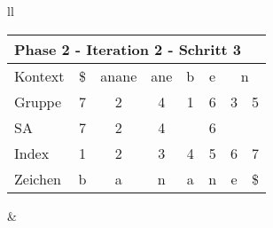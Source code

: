 \begin{table}[H]
\begin{adjustbox}{max width=\textwidth}
\begin{tabular}{ll}
\begin{tabular}{lccccccc}
\multicolumn{8}{l}{Phase 2 - Iteration 2 - Schritt 3}                                                                                                                                                             \\ \hline
\multicolumn{1}{l|}{Kontext} & \multicolumn{1}{c|}{\$}   & \multicolumn{1}{c|}{\cellcolor[HTML]{\green}anane} & \multicolumn{1}{c|}{ane} & \multicolumn{1}{c|}{b} & \multicolumn{1}{c|}{e} & \multicolumn{2}{c}{n} \\
\multicolumn{1}{l|}{Gruppe}  & \multicolumn{1}{c|}{7}    & \multicolumn{1}{c|}{\cellcolor[HTML]{\green}2}     & \multicolumn{1}{c|}{4}   & \multicolumn{1}{c|}{1} & \multicolumn{1}{c|}{6} & 3         & 5         \\
\multicolumn{1}{l|}{SA}      & \multicolumn{1}{c|}{7}    & \multicolumn{1}{c|}{\cellcolor[HTML]{\green}2}     & \multicolumn{1}{c|}{4}   & \multicolumn{1}{c|}{}  & \multicolumn{1}{c|}{6} &           &            \\ \hline
\multicolumn{1}{l|}{Index}   & \cellcolor[HTML]{\blue}1 & \cellcolor[HTML]{\green}2                          & 3                        & 4                      & 5                      & 6         & 7          \\
\multicolumn{1}{l|}{Zeichen} & \cellcolor[HTML]{\blue}b & \cellcolor[HTML]{\green}a                          & n                        & a                      & n                      & e         & \$        
\end{tabular}

&


\end{tabular}
\end{adjustbox}
\end{table}
